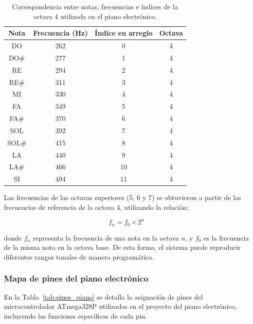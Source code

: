 \begin{table}[H]
\centering
\begin{tabular}{|c|c|c|c|}
\hline
\textbf{Nota} & \textbf{Frecuencia (Hz)} & \textbf{Índice en arreglo} & \textbf{Octava} \\
\hline
DO  & 262 & 0  & 4 \\
DO\# & 277 & 1  & 4 \\
RE  & 294 & 2  & 4 \\
RE\# & 311 & 3  & 4 \\
MI  & 330 & 4  & 4 \\
FA  & 349 & 5  & 4 \\
FA\# & 370 & 6  & 4 \\
SOL & 392 & 7  & 4 \\
SOL\# & 415 & 8  & 4 \\
LA  & 440 & 9  & 4 \\
LA\# & 466 & 10 & 4 \\
SI  & 494 & 11 & 4 \\
\hline
\end{tabular}
\caption{Correspondencia entre notas, frecuencias e índices de la octava 4 utilizada en el piano electrónico.}
\label{tab:notas_piano}
\end{table}

Las frecuencias de las octavas superiores (5, 6 y 7) se obtuvieron a partir de las frecuencias de referencia de la octava 4, 
utilizando la relación:

\[
f_{n} = f_{0} \times 2^{n}
\]

donde \( f_{n} \) representa la frecuencia de una nota en la octava \( n \), 
y \( f_{0} \) es la frecuencia de la misma nota en la octava base. 
De esta forma, el sistema puede reproducir diferentes rangos tonales de manera programática.

\subsubsection{Mapa de pines del piano electrónico}

En la Tabla~\ref{tab:pines_piano} se detalla la asignación de pines del microcontrolador ATmega328P utilizados en el proyecto del piano electrónico, incluyendo las funciones específicas de cada pin.

\begin{table}[H]
\centering
{}
\caption{Asignación de pines utilizada en el piano electrónico.}
\label{tab:pines_piano}
\end{table}

